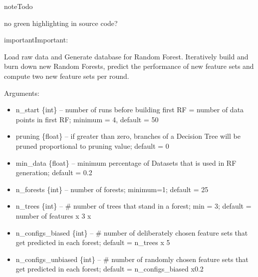 \documentclass[letterpaper,10pt,english]{sphinxmanual}
\begin{document}
\begin{sphinxadmonition}{note}{Todo}

no green highlighting in source code?
\end{sphinxadmonition}

\begin{sphinxadmonition}{important}{Important:}

\begin{fulllineitems}
\label{\detokenize{execution:ForestFire.Main.main_loop}}
Load raw data and Generate database for Random Forest. Iteratively build and burn down new Random Forests, predict the performance of new feature sets and compute two new feature sets per round.

Arguments:
\begin{itemize}
\item {} 
n\_start \{int\} -- number of runs before building first RF = number of data points in first RF; minimum = 4, default = 50

\item {} 
pruning \{float\} -- if greater than zero, branches of a Decision Tree will be pruned proportional to pruning value; default = 0

\item {} 
min\_data \{float\} -- minimum percentage of Datasets that is used in RF generation; default = 0.2

\item {} 
n\_forests \{int\} -- number of forests; minimum=1;  default = 25

\item {} 
n\_trees \{int\} -- \# number of trees that stand in a forest; min = 3; default = number of features x 3 x

\item {} 
n\_configs\_biased \{int\} -- \# number of deliberately chosen feature sets that get predicted in each forest; default = n\_trees x 5

\item {} 
n\_configs\_unbiased \{int\} -- \# number of randomly chosen feature sets that get predicted in each forest; default = n\_configs\_biased x0.2


\end{itemize}
\end{fulllineitems}
\end{sphinxadmonition}
\end{document}
